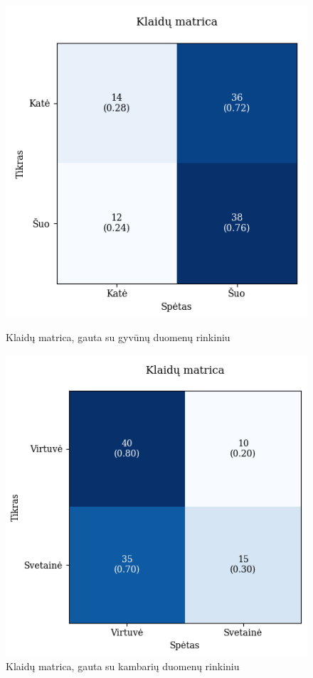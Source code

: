 \documentclass{VUMIFPSbakalaurinis}
\begin{document}
\begin{figure}[!htbp]
    \centering
    \begin{minipage}[b]{0.48\textwidth}
      \includegraphics[width=\textwidth]{img/GrapthsNEW/Small/animal/10/KM_DC_S_10.png}
      \caption{Klaidų matrica, gauta su gyvūnų duomenų rinkiniu}
    \end{minipage}
    \hspace{2mm}
    \begin{minipage}[b]{0.48\textwidth}
      \includegraphics[width=\textwidth]{img/GrapthsNEW/Small/room/10/KM_R_S_10.png}
      \caption{Klaidų matrica, gauta su kambarių duomenų rinkiniu}
    \end{minipage}
\end{figure}
\end{document}
